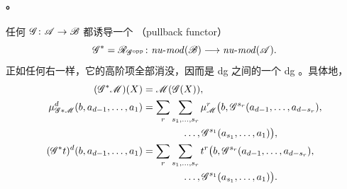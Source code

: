\paragraph{\trPullback。}\label{sub:pullback}
任何\trNonunital{} \trAFunctor{} $\mathscr{G}\colon\mathscr{A}\to\mathscr{B}$ 都诱导一个%
\textbf{\trPullback\trFunctor}（pullback functor）
\begin{equation}\label{eq:pullback-functor-definition}
\mathscr{G}^*=\mathscr{R}_{\mathscr{G}^{\mathrm{opp}}}\colon
\mathit{nu}\text{-}\mathit{mod}(\mathscr{B})
\longrightarrow\mathit{nu}\text{-}\mathit{mod}(\mathscr{A}).
\end{equation}
正如任何右\trComposition{}一样，它的高阶项全部消没，因而是 dg \trCategory{}之间的一个%
\trNonunital{} dg \trFunctor。具体地，
\begin{equation*}
\begin{aligned}
(\mathscr{G}^*\mathscr{M})(X)&=\mathscr{M}(\mathscr{G}(X)),\\
\mu^d_{\mathscr{G}*\mathscr{M}}(b,a_{d-1},\ldots,a_1)
&=\sum_r\sum_{s_1,\ldots,s_r}\mu^r_{\mathscr{M}}
\bigl(b,\mathscr{G}^{s_r}(a_{d-1},\ldots,a_{d-s_r}),\\
&\qquad\qquad\ldots,\mathscr{G}^{s_1}(a_{s_1},\ldots,a_1)\bigr),\\
(\mathscr{G}^*t)^d(b,a_{d-1},\ldots,a_1)
&=\sum_r\sum_{s_1,\ldots,s_r}t^r
\bigl(b,\mathscr{G}^{s_r}(a_{d-1},\ldots,a_{d-s_r}),\\
&\qquad\qquad\ldots,\mathscr{G}^{s_1}(a_{s_1},\ldots,a_1)\bigr).
\end{aligned}
\end{equation*}

